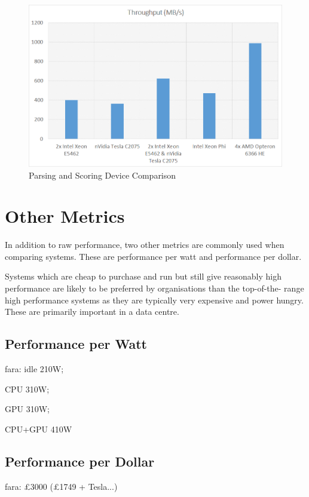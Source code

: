 \begin{figure}[H]
\centering
\includegraphics[width=\linewidth]{images/parsingScoringBest.png}
\caption{Parsing and Scoring Device Comparison}
\label{fig:parseScoringBest}
\end{figure}

\section{Other Metrics}

In addition to raw performance, two other metrics are commonly used when
comparing systems. These are performance per watt and performance per dollar.

Systems which are cheap to purchase and run but still give reasonably high
performance are likely to be preferred by organisations than the top-of-the-
range high performance systems as they are typically very expensive and power
hungry. These are primarily important in a data centre.

\subsection{Performance per Watt}

fara: idle 210W;

CPU 310W;

GPU 310W;

CPU+GPU 410W

\subsection{Performance per Dollar}

fara: £3000 (£1749 + Tesla...)


